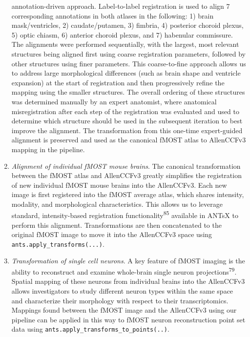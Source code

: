 \documentclass[
  12pt,
]{article}
\begin{document}
\begin{enumerate}
  annotation-driven approach. Label-to-label registration is used to
  align 7 corresponding annotations in both atlases in the following: 1)
  brain mask/ventricles, 2) caudate/putamen, 3) fimbria, 4) posterior
  choroid plexus, 5) optic chiasm, 6) anterior choroid plexus, and 7)
  habenular commissure. The alignments were performed sequentially, with
  the largest, most relevant structures being aligned first using coarse
  registration parameters, followed by other structures using finer
  parameters. This coarse-to-fine approach allows us to address large
  morphological differences (such as brain shape and ventricle
  expansion) at the start of registration and then progressively refine
  the mapping using the smaller structures. The overall ordering of
  these structures was determined manually by an expert anatomist, where
  anatomical misregistration after each step of the registration was
  evaluated and used to determine which structure should be used in the
  subsequent iteration to best improve the alignment. The transformation
  from this one-time expert-guided alignment is preserved and used as
  the canonical fMOST atlas to AllenCCFv3 mapping in the pipeline.
\item
  \emph{Alignment of individual fMOST mouse brains}. The canonical
  transformation between the fMOST atlas and AllenCCFv3 greatly
  simplifies the registration of new individual fMOST mouse brains into
  the AllenCCFv3. Each new image is first registered into the fMOST
  average atlas, which shares intensity, modality, and morphological
  characteristics. This allows us to leverage standard, intensity-based
  registration functionality\textsuperscript{85} available in ANTsX to
  perform this alignment. Transformations are then concatenated to the
  original fMOST image to move it into the AllenCCFv3 space using
  \texttt{ants.apply\_transforms(...)}.
\item
  \emph{Transformation of single cell neurons}. A key feature of fMOST
  imaging is the ability to reconstruct and examine whole-brain single
  neuron projections\textsuperscript{79}. Spatial mapping of these
  neurons from individual brains into the AllenCCFv3 allows
  investigators to study different neuron types within the same space
  and characterize their morphology with respect to their
  transcriptomics. Mappings found between the fMOST image and the
  AllenCCFv3 using our pipeline can be applied in this way to fMOST
  neuron reconstruction point set data using
  \texttt{ants.apply\_transforms\_to\_points(..)}.
\end{enumerate}
\end{document}
